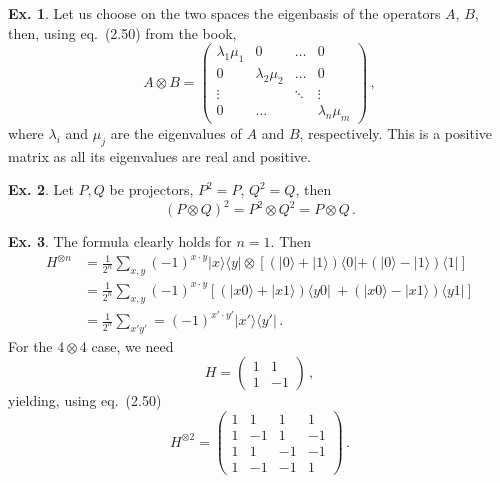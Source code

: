 \documentclass[a4paper,12pt]{article}
\theoremstyle{definition}
\newtheorem{exercise}{Ex.}[section]
\begin{document}
\begin{exercise}
 Let us choose on the two spaces the eigenbasis of the operators $A$, $B$, then, using eq.\ (2.50) from the book,
 \[
  A\otimes B = \begin{pmatrix} \lambda_1 \mu_1 &0 &\dots & 0 \\ 0 & \lambda_2\mu_2 &\dots & 0\\ \vdots &  & \ddots & \vdots \\ 0 & \dots &  & \lambda_n \mu_m \end{pmatrix}\,,
 \]
 where $\lambda_i$ and $\mu_j$ are the eigenvalues of $A$ and $B$, respectively. This is a positive matrix as all its eigenvalues are real and positive.
\end{exercise}

\begin{exercise}
 Let $P,Q$ be projectors, $P^2=P$, $Q^2=Q$, then
 \[
  (P\otimes Q)^2 = P^2\otimes Q^2=P\otimes Q\,.
 \]
\end{exercise}

\begin{exercise}
 The formula clearly holds for $n=1$. Then
 \[\begin{aligned}
  H^{\otimes n} &= \frac{1}{2^n}\sum_{x,y}(-1)^{x\cdot y} |x\rangle\langle y| \otimes \left[\left( |0\rangle +|1\rangle\right)\langle 0| + \left(|0\rangle -|1\rangle\right)\langle 1|\right]\\
  &=\frac{1}{2^n}\sum_{x,y}(-1)^{x\cdot y} \left[ \left(|x 0\rangle + |x 1\rangle\right)\langle y0|\ + \left( |x 0\rangle - |x 1\rangle\right) \langle y 1|\right]\\
  &= \frac{1}{2^n}\sum_{x'y'} = (-1)^{x'\cdot y'} |x'\rangle\langle y'|\,.
 \end{aligned}\]
 For the $4\otimes 4$ case, we need
 \[
  H = \begin{pmatrix} 1 & 1 \\ 1 & -1 \end{pmatrix}\,,
 \]
yielding, using eq.\ (2.50)
 \[
  H^{\otimes 2} =
  \begin{pmatrix}
   1 & 1    &  1 & 1 \\
   1 & -1   &  1 & -1 \\
%
   1 & 1    & -1 & -1 \\
   1 & -1   & -1 & 1
  \end{pmatrix}\,.
 \]
\end{exercise}
\end{document}
